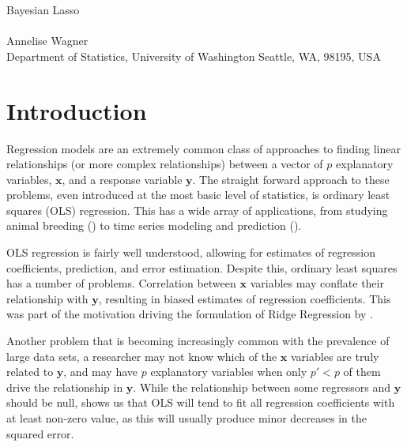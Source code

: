 \documentclass{uwstat572}
\begin{document}

\begin{center}
  {\LARGE Bayesian Lasso}\\\ \\
  {Annelise Wagner \\ 
    Department of Statistics, University of Washington Seattle, WA, 98195, USA
  }
\end{center}

\begin{abstract}
  The Bayesian Lasso, building on the interpretation of Tibshirani, places Laplace priors on linear regression coefficients to allow for Bayesian approaches to parameter and error estimation. Taking advantage of a scale mixture of normals re-expression for the Laplacian distribution allows for easy sampling from full conditionals which in turn culminate in a simple Gibbs sampler to produce credible intervals on estimated coefficients.
\end{abstract}

\section{Introduction}\label{Introduction}
Regression models are an extremely common class of approaches to finding linear relationships (or more complex relationships) between a vector of $p$ explanatory variables, $\mathbf{x}$, and a response variable $\mathbf{y}$. The straight forward approach to these problems, even introduced at the most basic level of statistics, is ordinary least squares (OLS) regression. This has a wide array of applications, from studying animal breeding (\cite{mrode2014linear}) to time series modeling and prediction (\cite{brockwell1991time}).

OLS regression is fairly well understood, allowing for estimates of regression coefficients, prediction, and error estimation. Despite this, ordinary least squares has a number of problems. Correlation between $\mathbf{x}$ variables may conflate their relationship with $\mathbf{y}$, resulting in biased estimates of regression coefficients. This was part of the motivation driving the formulation of Ridge Regression by \cite{hoerl1970ridge}.

Another problem that is becoming increasingly common with the prevalence of large data sets, a researcher may not know which of the $\mathbf{x}$ variables are truly related to $\mathbf{y}$, and may have $p$ explanatory variables when only $p'<p$ of them drive the relationship in $\mathbf{y}$. While the relationship between some regressors and $\mathbf{y}$ should be null, \cite{seeger2008bayesian} shows us that OLS will tend to fit all regression coefficients with at least non-zero value, as this will usually produce minor decreases in the squared error.
\end{document}
